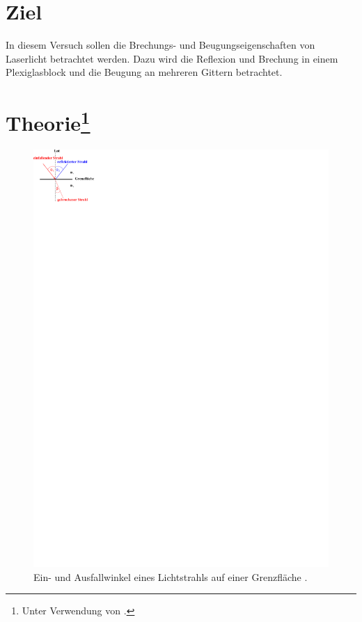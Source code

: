 \section{Ziel}
In diesem Versuch sollen die Brechungs- und Beugungseigenschaften von Laserlicht betrachtet werden.
Dazu wird die Reflexion und Brechung in einem Plexiglasblock und die Beugung an mehreren Gittern betrachtet.

\section[Theorie]{Theorie\footnote[1]{Unter Verwendung von \cite{man:v400}.}}
\begin{figure}
    \includegraphics{Abbildungen/Ein_Ausfallwinkel.pdf}
    \caption{Ein- und Ausfallwinkel eines Lichtstrahls auf einer Grenzfläche \cite{man:v400}.}
    \label{fig:teo_refl_brech}
\end{figure}
